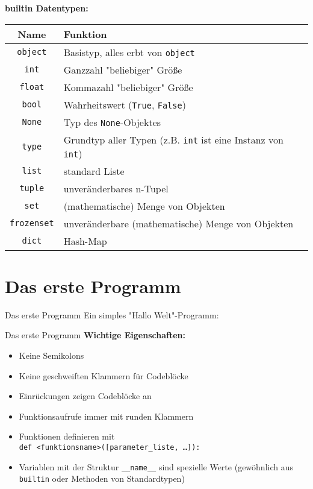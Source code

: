 \begin{frame}
	\textbf{builtin Datentypen:}\\
	\begin{tabular}{c|l}
		Name & Funktion \\ \hline
		\texttt{object} & Basistyp, alles erbt von \texttt{object} \\
		\texttt{int} & Ganzzahl "beliebiger" Größe \\
		\texttt{float} & Kommazahl "beliebiger" Größe \\
		\texttt{bool} & Wahrheitswert (\texttt{True}, \texttt{False})\\
		\texttt{None} & Typ des \texttt{None}-Objektes \\
		\texttt{type} & Grundtyp aller Typen (z.B. \texttt{int} ist eine Instanz von \texttt{int}) \\
		\texttt{list} & standard Liste \\
		\texttt{tuple} & unveränderbares n-Tupel \\
		\texttt{set} & (mathematische) Menge von Objekten \\
		\texttt{frozenset} & unveränderbare (mathematische) Menge von Objekten \\
		\texttt{dict} & Hash-Map \\
	\end{tabular}
\end{frame}


\section{Das erste Programm}
\begin{frame}[fragile]{Das erste Programm}
	Ein simples "Hallo Welt"-Programm:\\[.5cm]
	
\end{frame}


\begin{frame}[fragile]{Das erste Programm}
	\textbf{Wichtige Eigenschaften:}
	\begin{itemize}
	    \item Keine Semikolons
	    \item Keine geschweiften Klammern für Codeblöcke
	    \item Einrückungen zeigen Codeblöcke an
	    \item Funktionsaufrufe immer mit runden Klammern
	    \item Funktionen definieren mit \\
	   		  \alert{\texttt{def <funktionsname>([parameter\_liste, \ldots]):}}
	    \item Variablen mit der Struktur \alert{\texttt{\_\_name\_\_}} sind spezielle Werte (gewöhnlich aus \alert{\texttt{builtin}} oder Methoden von Standardtypen)
	\end{itemize}
\end{frame}


